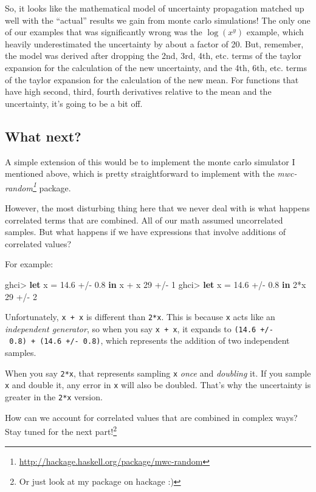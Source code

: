 \documentclass[]{article}
\newenvironment{Shaded}{}{}
\newcommand{\KeywordTok}[1]{\textcolor[rgb]{0.00,0.44,0.13}{\textbf{{#1}}}}
\newcommand{\DecValTok}[1]{\textcolor[rgb]{0.25,0.63,0.44}{{#1}}}
\newcommand{\FloatTok}[1]{\textcolor[rgb]{0.25,0.63,0.44}{{#1}}}
\newcommand{\FunctionTok}[1]{\textcolor[rgb]{0.02,0.16,0.49}{{#1}}}
\newcommand{\NormalTok}[1]{{#1}}
\renewcommand{\href}[2]{#2\footnote{\url{#1}}}
\begin{document}
So, it looks like the mathematical model of uncertainty propagation
matched up well with the ``actual'' results we gain from monte carlo
simulations! The only one of our examples that was significantly wrong
was the \(\operatorname{log}(x^y)\) example, which heavily
underestimated the uncertainty by about a factor of 20. But, remember,
the model was derived after dropping the 2nd, 3rd, 4th, etc. terms of
the taylor expansion for the calculation of the new uncertainty, and the
4th, 6th, etc. terms of the taylor expansion for the calculation of the
new mean. For functions that have high second, third, fourth derivatives
relative to the mean and the uncertainty, it's going to be a bit off.

\subsection{What next?}\label{what-next}

A simple extension of this would be to implement the monte carlo
simulator I mentioned above, which is pretty straightforward to
implement with the
\emph{\href{http://hackage.haskell.org/package/mwc-random}{mwc-random}}
package.

However, the most disturbing thing here that we never deal with is what
happens correlated terms that are combined. All of our math assumed
uncorrelated samples. But what happens if we have expressions that
involve additions of correlated values?

For example:

\begin{Shaded}
\begin{Highlighting}[]
\NormalTok{ghci}\FunctionTok{>} \KeywordTok{let} \NormalTok{x }\FunctionTok{=} \FloatTok{14.6} \FunctionTok{+/-} \FloatTok{0.8} \KeywordTok{in} \NormalTok{x }\FunctionTok{+} \NormalTok{x}
\DecValTok{29} \FunctionTok{+/-} \DecValTok{1}
\NormalTok{ghci}\FunctionTok{>} \KeywordTok{let} \NormalTok{x }\FunctionTok{=} \FloatTok{14.6} \FunctionTok{+/-} \FloatTok{0.8} \KeywordTok{in} \DecValTok{2}\FunctionTok{*}\NormalTok{x}
\DecValTok{29} \FunctionTok{+/-} \DecValTok{2}
\end{Highlighting}
\end{Shaded}

Unfortunately, \texttt{x\ +\ x} is different than \texttt{2*x}. This is
because \texttt{x} acts like an \emph{independent generator}, so when
you say \texttt{x\ +\ x}, it expands to
\texttt{(14.6\ +/-\ 0.8)\ +\ (14.6\ +/-\ 0.8)}, which represents the
addition of two independent samples.

When you say \texttt{2*x}, that represents sampling \texttt{x}
\emph{once} and \emph{doubling} it. If you sample \texttt{x} and double
it, any error in \texttt{x} will also be doubled. That's why the
uncertainty is greater in the \texttt{2*x} version.

How can we account for correlated values that are combined in complex
ways? Stay tuned for the next part!\footnote{Or just look at my package
  on hackage :)}
\end{document}
